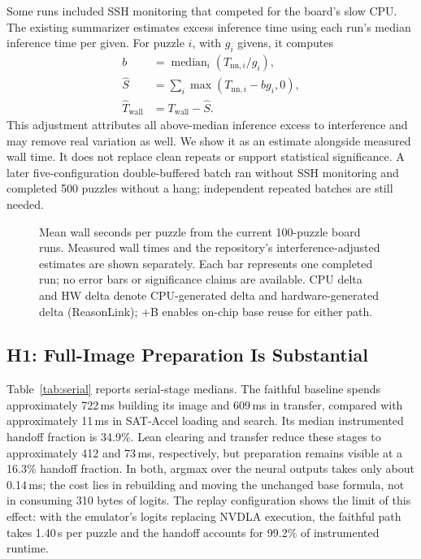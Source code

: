 Some runs included SSH monitoring that competed for the board's slow CPU. The existing summarizer estimates excess inference time using each run's median inference time per given. For puzzle $i$, with $g_i$ givens, it computes
\begin{align}
b &= \operatorname{median}_i(T_{\mathrm{nn},i}/g_i),\\
\widehat{S} &= \sum_i\max(T_{\mathrm{nn},i}-b g_i,0),\\
\widehat{T}_{\mathrm{wall}} &= T_{\mathrm{wall}}-\widehat{S}.
\end{align}
This adjustment attributes all above-median inference excess to interference and may remove real variation as well. We show it as an estimate alongside measured wall time. It does not replace clean repeats or support statistical significance. A later five-configuration double-buffered batch ran without SSH monitoring and completed 500 puzzles without a hang; independent repeated batches are still needed.


\begin{figure}[t]
\centering

\caption{Mean wall seconds per puzzle from the current 100-puzzle board runs. Measured wall times and the repository's interference-adjusted estimates are shown separately. Each bar represents one completed run; no error bars or significance claims are available. CPU delta and HW delta denote CPU-generated delta and hardware-generated delta (ReasonLink); +B enables on-chip base reuse for either path.}
\label{fig:wall}
\end{figure}

\subsection{H1: Full-Image Preparation Is Substantial}
Table~\ref{tab:serial} reports serial-stage medians. The faithful baseline spends approximately 722\,ms building its image and 609\,ms in transfer, compared with approximately 11\,ms in SAT-Accel loading and search. Its median instrumented handoff fraction is 34.9\%. Lean clearing and transfer reduce these stages to approximately 412 and 73\,ms, respectively, but preparation remains visible at a 16.3\% handoff fraction. In both, argmax over the neural outputs takes only about 0.14\,ms; the cost lies in rebuilding and moving the unchanged base formula, not in consuming 310 bytes of logits. The replay configuration shows the limit of this effect: with the emulator's logits replacing NVDLA execution, the faithful path takes 1.40\,s per puzzle and the handoff accounts for 99.2\% of instrumented runtime.

